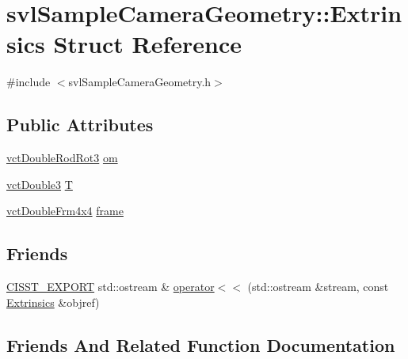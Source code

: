 \hypertarget{structsvl_sample_camera_geometry_1_1_extrinsics}{}\section{svl\+Sample\+Camera\+Geometry\+:\+:Extrinsics Struct Reference}
\label{structsvl_sample_camera_geometry_1_1_extrinsics}


{\ttfamily \#include $<$svl\+Sample\+Camera\+Geometry.\+h$>$}

\subsection*{Public Attributes}
\begin{DoxyCompactItemize}
\item 
\hyperlink{vct_transformation_types_8h_a350d1047878839beb9dd36107516bd75}{vct\+Double\+Rod\+Rot3} \hyperlink{structsvl_sample_camera_geometry_1_1_extrinsics_abd8791bf9873b33112dba8c6fb055a62}{om}
\item 
\hyperlink{vct_fixed_size_vector_types_8h_a4a89122c9d7f72c3f31fe8126e17c3af}{vct\+Double3} \hyperlink{structsvl_sample_camera_geometry_1_1_extrinsics_aeeb68b4523c0230563b17f03bc7f5ebe}{T}
\item 
\hyperlink{vct_transformation_types_8h_ac7626dd8caf0095c4a1b427918c0f3b8}{vct\+Double\+Frm4x4} \hyperlink{structsvl_sample_camera_geometry_1_1_extrinsics_a9640da226d49f0f869ab02ab2636e760}{frame}
\end{DoxyCompactItemize}
\subsection*{Friends}
\begin{DoxyCompactItemize}
\item 
\hyperlink{cmn_export_macros_8h_a99393e0c3ac434b2605235bbe20684f8}{C\+I\+S\+S\+T\+\_\+\+E\+X\+P\+O\+R\+T} std\+::ostream \& \hyperlink{structsvl_sample_camera_geometry_1_1_extrinsics_afd73af7c4b4ded94b79da910e08e5351}{operator$<$$<$} (std\+::ostream \&stream, const \hyperlink{structsvl_sample_camera_geometry_1_1_extrinsics}{Extrinsics} \&objref)
\end{DoxyCompactItemize}


\subsection{Friends And Related Function Documentation}
\hypertarget{structsvl_sample_camera_geometry_1_1_extrinsics_afd73af7c4b4ded94b79da910e08e5351}{}
